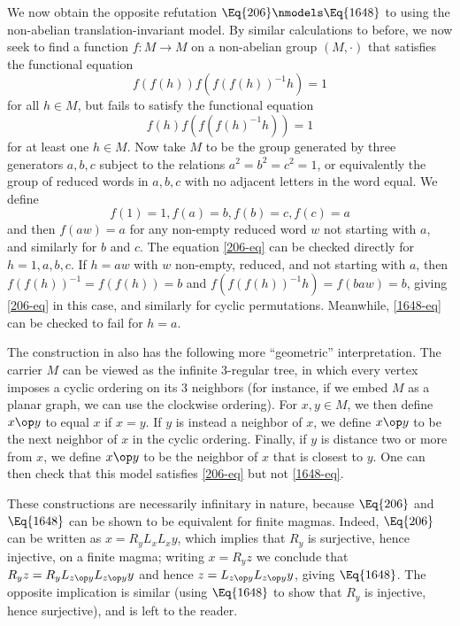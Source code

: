 \begin{example}\label{trans-nonab}  We now obtain the opposite refutation $\Eq{206} \nmodels \Eq{1648}$ to  using the non-abelian translation-invariant model.  By similar calculations to before, we now seek to find a function $f \colon M \to M$ on a non-abelian group $(M,\cdot)$ that satisfies the functional equation
\begin{equation}\label{206-eq}
 f(f(h)) f(f(f(h))^{-1} h) = 1
\end{equation}
for all $h \in M$, but fails to satisfy the functional equation
\begin{equation}\label{1648-eq}
   f(h) f(f(f(h)^{-1} h)) = 1
\end{equation}
for at least one $h \in M$.  Now take $M$ to be the group generated by three generators $a,b,c$ subject to the relations $a^2=b^2=c^2=1$, or equivalently the group of reduced words in $a,b,c$ with no adjacent letters in the word equal.  We define
$$ f(1) = 1, f(a)=b, f(b) = c, f(c) = a$$
and then $f(aw)=a$ for any non-empty reduced word $w$ not starting with $a$, and similarly for $b$ and $c$.  The equation \eqref{206-eq} can be checked directly for $h=1,a,b,c$.  If $h=aw$ with $w$ non-empty, reduced, and not starting with $a$, then $f(f(h))^{-1} = f(f(h)) = b$ and $f(f(f(h))^{-1} h) = f(baw) = b$, giving \eqref{206-eq} in this case, and similarly for cyclic permutations. Meanwhile, \eqref{1648-eq} can be checked to fail for $h=a$.
\end{example}

\begin{remark}  The construction in  also has the following more ``geometric'' interpretation.  The carrier $M$ can be viewed as the infinite $3$-regular tree, in which every vertex imposes a cyclic ordering on its $3$ neighbors (for instance, if we embed $M$ as a planar graph, we can use the clockwise ordering).  For $x,y \in M$, we then define $x \op y$ to equal $x$ if $x=y$.  If $y$ is instead a neighbor of $x$, we define $x \op y$ to be the next neighbor of $x$ in the cyclic ordering.  Finally, if $y$ is distance two or more from $x$, we define $x \op y$ to be the neighbor of $x$ that is closest to $y$.  One can then check that this model satisfies \eqref{206-eq} but not \eqref{1648-eq}.
\end{remark}

\begin{remark} These constructions are necessarily infinitary in nature, because $\Eq{206}$ and $\Eq{1648}$ can be shown to be equivalent for finite magmas. Indeed, $\Eq{206}$ can be written as $x = R_y L_x L_x y$, which implies that $R_y$ is surjective, hence injective, on a finite magma; writing $x = R_y z$ we conclude that $R_y z = R_y L_{z \op y} L_{z \op y} y$ and hence $z = L_{z \op y} L_{z \op y} y$, giving $\Eq{1648}$.  The opposite implication is similar (using $\Eq{1648}$ to show that $R_y$ is injective, hence surjective), and is left to the reader.
\end{remark}

